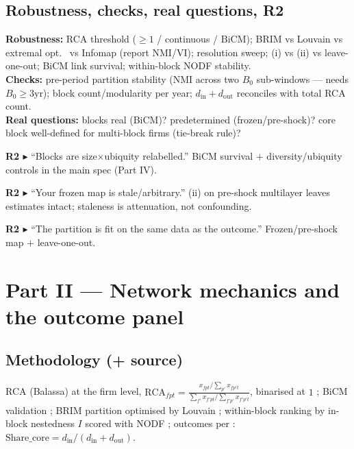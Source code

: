 \documentclass[11pt]{article}
\newcommand{\din}{d_{\mathrm{in}}}
\newcommand{\dout}{d_{\mathrm{out}}}
\newcommand{\sharecore}{\mathrm{Share\_core}}
\newcommand{\R}[1]{\par\smallskip\noindent\textbf{\textcolor{red!55!black}{R2 $\blacktriangleright$}} #1}
\begin{document}
\subsection{Robustness, checks, real questions, R2}
\textbf{Robustness:} RCA threshold ($\ge1$ / continuous / BiCM); BRIM vs Louvain
\citep{blondel2008} vs extremal opt.\ \citep{ducharenas2005} vs Infomap
\citep{rosvall2008} (report NMI/VI); resolution sweep; (i) vs (ii) vs leave-one-out;
BiCM link survival; within-block NODF \citep{almeidaneto2008,soleribalta2018} stability.\\
\textbf{Checks:} pre-period partition stability (NMI across two $B_0$ sub-windows ---
needs $B_0\ge3$yr); block count/modularity per year; $\din+\dout$ reconciles with
total RCA count.\\
\textbf{Real questions:} blocks real (BiCM)? predetermined (frozen/pre-shock)? core
block well-defined for multi-block firms (tie-break rule)?
\begin{ref2}
\R{``Blocks are size$\times$ubiquity relabelled.''} BiCM survival $+$ diversity/ubiquity
controls \citep{nomaler2023} in the main spec (Part IV).
\R{``Your frozen map is stale/arbitrary.''} (ii) on pre-shock multilayer leaves
estimates intact; staleness is attenuation, not confounding.
\R{``The partition is fit on the same data as the outcome.''} Frozen/pre-shock map
$+$ leave-one-out.
\end{ref2}

\section{Part II --- Network mechanics and the outcome panel}
\label{part:net}

\subsection{Methodology (+ source)}
RCA (Balassa) at the firm level,
$\mathrm{RCA}_{fpt}=\frac{x_{fpt}/\sum_{p'}x_{fp't}}{\sum_{f'}x_{f'pt}/\sum_{f'p'}x_{f'p't}}$,
binarised at $1$ \citep[firm-level transfer of][]{hidalgo2011,bruno2018,bruno2023};
BiCM validation \citep{squartini2011,saracco2015,cimini2022}; BRIM partition
\citep{barber2007} optimised by Louvain \citep{blondel2008}; within-block ranking by
in-block nestedness $I$ \citep{soleribalta2018} scored with NODF
\citep{almeidaneto2008}; outcomes per \citet{destefano2025}:
$\sharecore=\din/(\din+\dout)$.
\end{document}
